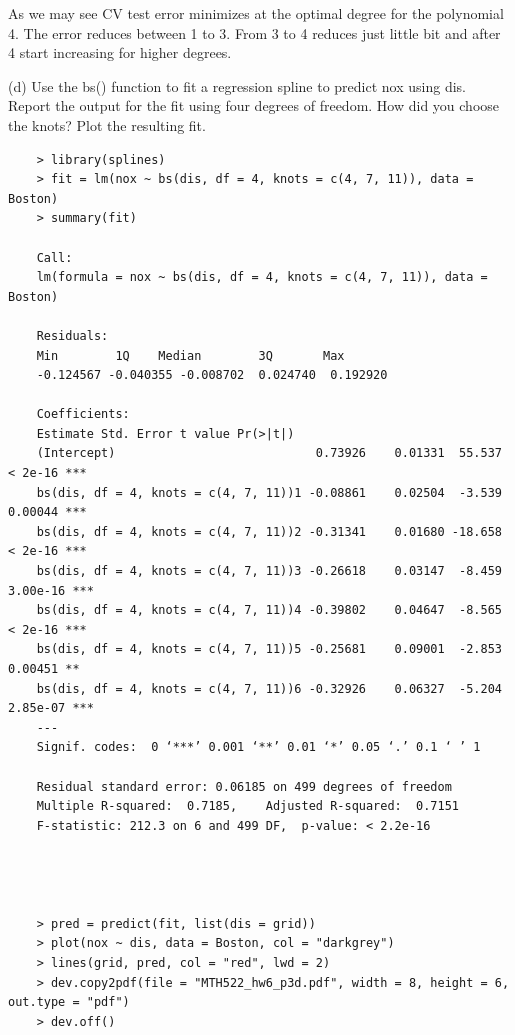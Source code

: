 \documentclass{article}
\begin{document}
As we may see CV test error minimizes at the optimal degree for the polynomial 4. The error reduces between 1 to 3. From 3 to 4 reduces just little bit and after 4 start increasing for higher degrees.

\newpage


(d) Use the bs() function to fit a regression spline to predict nox using dis. Report the output for the fit using four degrees of freedom. How did you choose the knots? Plot the resulting fit.\\

\begin{program}
	\begin{verbatim}
	> library(splines)
	> fit = lm(nox ~ bs(dis, df = 4, knots = c(4, 7, 11)), data = Boston)
	> summary(fit)
	
	Call:
	lm(formula = nox ~ bs(dis, df = 4, knots = c(4, 7, 11)), data = Boston)
	
	Residuals:
	Min        1Q    Median        3Q       Max 
	-0.124567 -0.040355 -0.008702  0.024740  0.192920 
	
	Coefficients:
	Estimate Std. Error t value Pr(>|t|)    
	(Intercept)                            0.73926    0.01331  55.537  < 2e-16 ***
	bs(dis, df = 4, knots = c(4, 7, 11))1 -0.08861    0.02504  -3.539  0.00044 ***
	bs(dis, df = 4, knots = c(4, 7, 11))2 -0.31341    0.01680 -18.658  < 2e-16 ***
	bs(dis, df = 4, knots = c(4, 7, 11))3 -0.26618    0.03147  -8.459 3.00e-16 ***
	bs(dis, df = 4, knots = c(4, 7, 11))4 -0.39802    0.04647  -8.565  < 2e-16 ***
	bs(dis, df = 4, knots = c(4, 7, 11))5 -0.25681    0.09001  -2.853  0.00451 ** 
	bs(dis, df = 4, knots = c(4, 7, 11))6 -0.32926    0.06327  -5.204 2.85e-07 ***
	---
	Signif. codes:  0 ‘***’ 0.001 ‘**’ 0.01 ‘*’ 0.05 ‘.’ 0.1 ‘ ’ 1
	
	Residual standard error: 0.06185 on 499 degrees of freedom
	Multiple R-squared:  0.7185,	Adjusted R-squared:  0.7151 
	F-statistic: 212.3 on 6 and 499 DF,  p-value: < 2.2e-16
	
	
	
	
	> pred = predict(fit, list(dis = grid))
	> plot(nox ~ dis, data = Boston, col = "darkgrey")
	> lines(grid, pred, col = "red", lwd = 2)
	> dev.copy2pdf(file = "MTH522_hw6_p3d.pdf", width = 8, height = 6, out.type = "pdf")
	> dev.off()
	\end{verbatim}
\end{program}

\newpage
\end{document}
